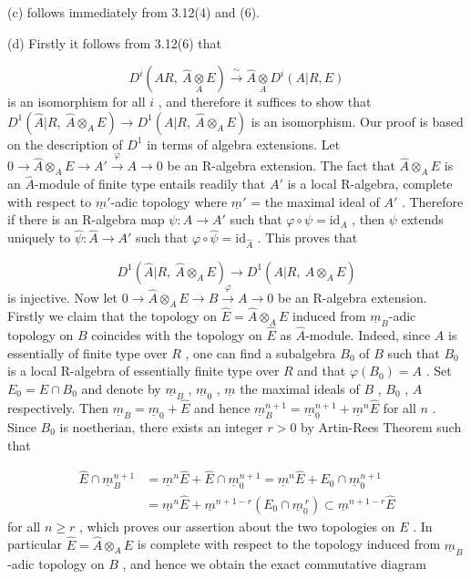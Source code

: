 (c)  follows immediately from 3.12(4) and (6).

(d)  Firstly it follows from 3.12(6) that

\begin{equation*}
D^i(A R, \ \hat{A}\underset{A}{\otimes}E) \xrightarrow{\ \sim\ } \hat{A}\underset{A}{\otimes}D^i(A|R, E)
\end{equation*}
is an isomorphism for all  $i$  , and therefore it suffices to show that
$D^1(\hat{A}|R,\ \hat{A}\otimes_A E) \to D^1(A|R,\ \hat{A}\otimes_A E)$  is an isomorphism. Our proof is based on the description of  $D^1$  in terms of algebra extensions. Let  $0 \to \hat{A}\otimes_A E \to A' \xrightarrow{\ \varphi\ } A \to 0$  be an R-algebra extension. The fact that  $\hat{A}\otimes_A E$  is an $\hat{A}$-module of finite type entails readily that  $A'$  is a local R-algebra, complete with respect to $\underline{m}'$-adic topology where  $\underline{m}'$ = the maximal ideal of  $A'$ . Therefore if there is an R-algebra map  $\psi : A \to A'$  such that  $\varphi \circ \psi = \mathrm{id}_A$ , then  $\psi$  extends uniquely to  $\hat{\psi} : \hat{A} \to A'$  such that  $\varphi \circ \hat{\psi} = \mathrm{id}_{\hat{A}}$ . This proves that

\begin{equation*}
D^1(\hat{A}|R,\ \hat{A}\otimes_A E) \to D^1(A|R,\ \hat{A}\otimes_A E)
\end{equation*}
is injective. Now let  $0 \to \hat{A}\otimes_A E \to B \xrightarrow{\ \varphi\ } A \to 0$  be an R-algebra extension. Firstly we claim that the topology on  $\hat{E} = \hat{A}\otimes_A E$  induced from  $\underline{m}_B$-adic topology on  $B$  coincides with the topology on  $\hat{E}$  as $\hat{A}$-module. Indeed, since  $A$  is essentially of finite type over  $R$ , one can find a subalgebra  $B_0$  of  $B$  such that  $B_0$  is a local R-algebra of essentially finite type over  $R$  and that  $\varphi(B_0) = A$ . Set  $E_0 = E \cap B_0$  and denote by  $\underline{m}_B$ , $\underline{m}_0$ , $\underline{m}$  the maximal ideals of  $B$ , $B_0$ , $A$  respectively. Then  $\underline{m}_B = \underline{m}_0 + \hat{E}$  and hence  $\underline{m}_B^{n+1} = \underline{m}_0^{n+1} + \underline{m}^n\hat{E}$  for all  $n$ . Since  $B_0$  is noetherian, there exists an integer  $r > 0$  by Artin-Rees Theorem such that

\begin{equation*}
\begin{aligned}
\hat{E} \cap \underline{m}_B^{n+1} &= \underline{m}^n\hat{E} + \hat{E} \cap \underline{m}_0^{n+1} = \underline{m}^n\hat{E} + E_0 \cap \underline{m}_0^{n+1}\\
&= \underline{m}^n\hat{E} + \underline{m}^{n+1-r}(E_0 \cap \underline{m}_0^{\,r}) \subset \underline{m}^{n+1-r}\hat{E}
\end{aligned}
\end{equation*}
for all  $n \geq r$ , which proves our assertion about the two topologies on  $E$  . In particular  $\hat{E} = \hat{A}\otimes_A E$  is complete with respect to the topology induced from $\underline{m}_B$-adic topology on  $B$ , and hence we obtain the exact commutative diagram

